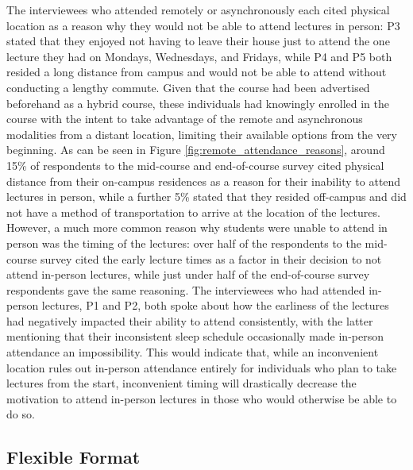 The interviewees who attended remotely or asynchronously each cited physical location as a reason why they would not be able to attend lectures in person: P3 stated that they enjoyed not having to leave their house just to attend the one lecture they had on Mondays, Wednesdays, and Fridays, while P4 and P5 both resided a long distance from campus and would not be able to attend without conducting a lengthy commute. Given that the course had been advertised beforehand as a hybrid course, these individuals had knowingly enrolled in the course with the intent to take advantage of the remote and asynchronous modalities from a distant location, limiting their available options from the very beginning. As can be seen in Figure \ref{fig:remote_attendance_reasons}, around 15\% of respondents to the mid-course and end-of-course survey cited physical distance from their on-campus residences as a reason for their inability to attend lectures in person, while a further 5\% stated that they resided off-campus and did not have a method of transportation to arrive at the location of the lectures. However, a much more common reason why students were unable to attend in person was the timing of the lectures: over half of the respondents to the mid-course survey cited the early lecture times as a factor in their decision to not attend in-person lectures, while just under half of the end-of-course survey respondents gave the same reasoning. The interviewees who had attended in-person lectures, P1 and P2, both spoke about how the earliness of the lectures had negatively impacted their ability to attend consistently, with the latter mentioning that their inconsistent sleep schedule occasionally made in-person attendance an impossibility. This would indicate that, while an inconvenient location rules out in-person attendance entirely for individuals who plan to take lectures from the start, inconvenient timing will drastically decrease the motivation to attend in-person lectures in those who would otherwise be able to do so.

\subsection{Flexible Format}

